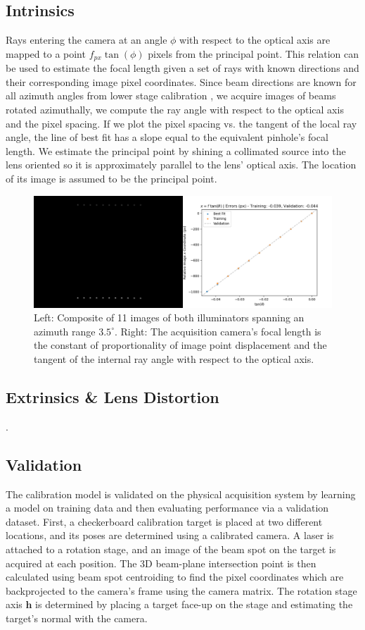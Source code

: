 \subsection{Intrinsics}
Rays entering the camera at an angle $\phi$ with respect to the optical axis are mapped to a point $f_{px} \tan(\phi)$ pixels from the principal point. This relation can be used to estimate the focal length given a set of rays with known directions and their corresponding image pixel coordinates. Since beam directions are known for all azimuth angles from lower stage calibration , we acquire images of beams rotated azimuthally, we compute the ray angle with respect to the optical axis and the pixel spacing. If we plot the pixel spacing vs. the tangent of the local ray angle, the line of best fit has a slope equal to the equivalent pinhole's focal length. We estimate the principal point by shining a collimated source into the lens oriented so it is approximately parallel to the lens' optical axis. The location of its image is assumed to be the principal point.
\begin{figure}
    \centering
    \includegraphics[width=0.75\linewidth]{../figures/focal_length_estimate.png}
    \caption{Left: Composite of 11 images of both illuminators spanning an azimuth range $3.5^\circ$. Right: The acquisition camera's focal length is the constant of proportionality of image point displacement and the tangent of the internal ray angle with respect to the optical axis.}
    \label{fig:focal_length_estimate}
\end{figure}

\subsection{Extrinsics \& Lens Distortion}
.

\subsection{Validation}
The calibration model is validated on the physical acquisition system by learning a model on training data and then evaluating performance via a validation dataset. First, a checkerboard calibration target is placed at two different locations, and its poses are determined using a calibrated camera. A laser is attached to a rotation stage, and an image of the beam spot on the target is acquired at each position. The 3D beam-plane intersection point is then calculated using beam spot centroiding to find the pixel coordinates which are backprojected to the camera's frame using the camera matrix. The rotation stage axis $\mathbf{h}$ is determined by placing a target face-up on the stage and estimating the target's normal with the camera.

